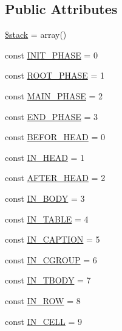 \subsection*{Public Attributes}
\begin{DoxyCompactItemize}
\item 
\hyperlink{classHTML5TreeConstructer_a6362d352c497f6289392b689bb08172a}{\$stack} = array()
\item 
const \hyperlink{classHTML5TreeConstructer_a025c5721f05fef6911dead9c3ce5dd17}{I\+N\+I\+T\+\_\+\+P\+H\+A\+S\+E} = 0
\item 
const \hyperlink{classHTML5TreeConstructer_ad5bb6803e6dd56fba50eea900c9796c8}{R\+O\+O\+T\+\_\+\+P\+H\+A\+S\+E} = 1
\item 
const \hyperlink{classHTML5TreeConstructer_ab47b9b28a03b9186cd5927e34a92ab00}{M\+A\+I\+N\+\_\+\+P\+H\+A\+S\+E} = 2
\item 
const \hyperlink{classHTML5TreeConstructer_a265916a150d9ab06d947eec0d62b3aec}{E\+N\+D\+\_\+\+P\+H\+A\+S\+E} = 3
\item 
const \hyperlink{classHTML5TreeConstructer_ab5f3195766fbba1539208145439ce17b}{B\+E\+F\+O\+R\+\_\+\+H\+E\+A\+D} = 0
\item 
const \hyperlink{classHTML5TreeConstructer_a1c19225b6fc03d03d65399bbf2775ea0}{I\+N\+\_\+\+H\+E\+A\+D} = 1
\item 
const \hyperlink{classHTML5TreeConstructer_aa7370b9a69df3ec094e3fcb46c61ef0d}{A\+F\+T\+E\+R\+\_\+\+H\+E\+A\+D} = 2
\item 
const \hyperlink{classHTML5TreeConstructer_a96dac03a6175a99d9c2b8061e3d91313}{I\+N\+\_\+\+B\+O\+D\+Y} = 3
\item 
const \hyperlink{classHTML5TreeConstructer_ab0c451330ab3a1a0387ef62bb4b48f1c}{I\+N\+\_\+\+T\+A\+B\+L\+E} = 4
\item 
const \hyperlink{classHTML5TreeConstructer_a9f9f002cd7a7a52ebd86ce97f2949f3f}{I\+N\+\_\+\+C\+A\+P\+T\+I\+O\+N} = 5
\item 
const \hyperlink{classHTML5TreeConstructer_a8bf6f6afa477e700461837f1464a94b8}{I\+N\+\_\+\+C\+G\+R\+O\+U\+P} = 6
\item 
const \hyperlink{classHTML5TreeConstructer_acd979180a3036c84c5b04f9547189f9a}{I\+N\+\_\+\+T\+B\+O\+D\+Y} = 7
\item 
const \hyperlink{classHTML5TreeConstructer_a9f89c87246db41e99ad83c2d6d87e0b4}{I\+N\+\_\+\+R\+O\+W} = 8
\item 
const \hyperlink{classHTML5TreeConstructer_a51864d0a059b9018f6ec895400802d06}{I\+N\+\_\+\+C\+E\+L\+L} = 9

\end{DoxyCompactItemize}

